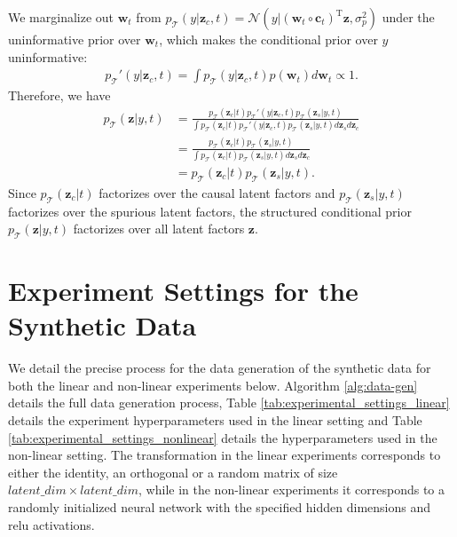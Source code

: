 \documentclass{article} %
\theoremstyle{plain}
\theoremstyle{definition}
\theoremstyle{remark}
\begin{document}
We marginalize out $\mathbf{w}_t$ from $p_{\mathcal{T}}(y|\mathbf{z}_c,t) =\mathcal{N}(y|(\mathbf{w}_t\circ\mathbf{c}_t)^{\text{T}}\mathbf{z},\sigma_{p}^{2})$ under the uninformative prior over $\mathbf{w}_t$, which makes the conditional prior over $y$ uninformative:
\begin{align}
    p_{\mathcal{T}}'(y|\mathbf{z}_c,t)=\int p_{\mathcal{T}}(y|\mathbf{z}_c,t)p(\mathbf{w}_t)d\mathbf{w}_t \propto 1.
\end{align}
Therefore, we have
\begin{align}
    p_{\mathcal{T}}(\mathbf{z}|y,t)
    &=\frac{p_{\mathcal{T}}(\mathbf{z}_c|t)p_{\mathcal{T}}'(y|\mathbf{z}_c,t)p_{\mathcal{T}}(\mathbf{z}_s|y,t)}{\int p_{\mathcal{T}}(\mathbf{z}_c|t)p_{\mathcal{T}}'(y|\mathbf{z}_c,t)p_{\mathcal{T}}(\mathbf{z}_s|y,t)d\mathbf{z}_s d\mathbf{z}_c}\\
    &=\frac{p_{\mathcal{T}}(\mathbf{z}_c|t)p_{\mathcal{T}}(\mathbf{z}_s|y,t)}{\int p_{\mathcal{T}}(\mathbf{z}_c|t)p_{\mathcal{T}}(\mathbf{z}_s|y,t)d\mathbf{z}_s d\mathbf{z}_c}\\
    &=p_{\mathcal{T}}(\mathbf{z}_c|t)p_{\mathcal{T}}(\mathbf{z}_s|y,t).
\end{align}
Since $p_{\mathcal{T}}(\mathbf{z}_c|t)$ factorizes over the causal latent factors and $p_{\mathcal{T}}(\mathbf{z}_s|y,t)$ factorizes over the spurious latent factors, the structured conditional prior $p_{\mathcal{T}}(\mathbf{z}|y,t)$ factorizes over all latent factors $\mathbf{z}$.

\section{Experiment Settings for the Synthetic Data}
\label{appendix: experiment-settings-synth}
We detail the precise process for the data generation of the synthetic data for both the linear and non-linear experiments below. Algorithm \ref{alg:data-gen} details the full data generation process, Table \ref{tab:experimental_settings_linear} details the experiment hyperparameters used in the linear setting and Table \ref{tab:experimental_settings_nonlinear} details the hyperparameters used in the non-linear setting. The transformation in the linear experiments corresponds to either the identity, an orthogonal or a random matrix of size $latent\_dim \times latent\_dim$, while in the non-linear experiments it corresponds to a randomly initialized neural network with the specified hidden dimensions and relu activations.
\end{document}
